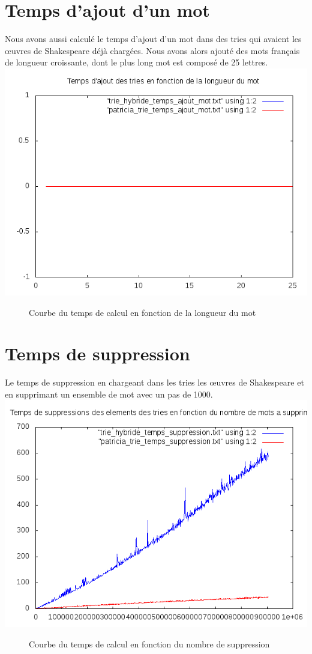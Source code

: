 \documentclass[a4paper,12pt]{report}
\begin{document}
\section{Temps d'ajout d'un mot}
Nous avons aussi calculé le temps d'ajout d'un mot dans des tries qui avaient les œuvres de Shakespeare déjà chargées. Nous avons alors
ajouté des mots français de longueur croissante, dont le plus long mot est composé de 25 lettres.\\
\includegraphics{../comparaison/courbe_ajout_mot.png}
\begin{figure}[!htbp]
\caption{Courbe du temps de calcul en fonction de la longueur du mot}
\end{figure}
\section{Temps de suppression}
Le temps de suppression en chargeant dans les tries les œuvres de Shakespeare et en supprimant un ensemble de mot avec un pas
de 1000.\\
\includegraphics{../comparaison/courbe_temps_suppression.png}
\begin{figure}[!htbp]
\caption{Courbe du temps de calcul en fonction du nombre de suppression}
\end{figure}
\end{document}
